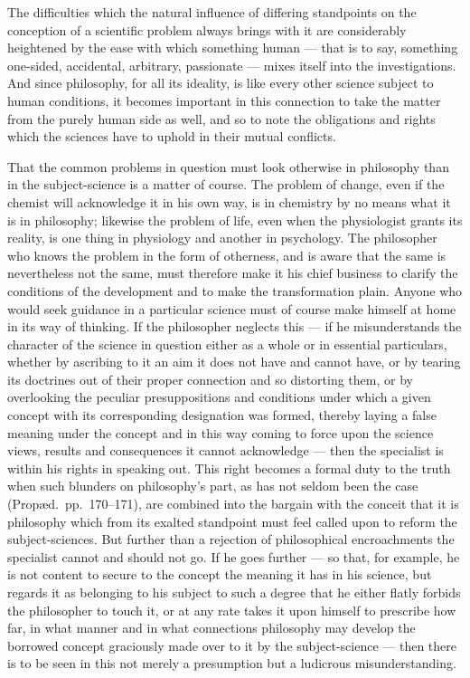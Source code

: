 \documentclass[12pt,a4paper]{book}
\begin{document}
The difficulties which the natural influence of differing standpoints on the
conception of a scientific problem always brings with it are considerably
heightened by the ease with which something human --- that is to say, something
one-sided, accidental, arbitrary, passionate --- mixes itself into the
investigations. And since philosophy, for all its ideality, is like every other
science subject to human conditions, it becomes important in this connection to
take the matter from the purely human side as well, and so to note the
obligations and rights which the sciences have to uphold in their mutual
conflicts.

That the common problems in question must look otherwise in philosophy than in
the subject-science is a matter of course. The problem of change, even if the
chemist will acknowledge it in his own way, is in chemistry
by no means what it is in philosophy; likewise the problem of life, even when
the physiologist grants its reality, is one thing in physiology and another in
psychology. The philosopher who knows the problem in the form of otherness, and
is aware that the same is nevertheless not the same, must therefore make it his
chief business to clarify the conditions of the development and to make the
transformation plain. Anyone who would seek guidance in a particular science
must of course make himself at home in its way of thinking. If the philosopher
neglects this --- if he misunderstands the character of the science in question
either as a whole or in essential particulars, whether by ascribing to it an
aim it does not have and cannot have, or by tearing its doctrines out of their
proper connection and so distorting them, or by overlooking the peculiar
presuppositions and conditions under which a given concept with its
corresponding designation was formed, thereby laying a false meaning under the
concept and in this way coming to force upon the science views, results and
consequences it cannot acknowledge --- then the specialist is within his rights
in speaking out. This right becomes a formal duty to the truth when such
blunders on philosophy's part, as has not seldom been the case (Propæd.\
pp.~170--171), are combined into the bargain with the conceit that it is
philosophy which from its exalted standpoint must feel called upon to reform
the subject-sciences. But further than a rejection of philosophical
encroachments the specialist cannot and should not go. If he goes further ---
so that, for example, he is not content to secure to the concept the meaning it
has in his science, but regards it as belonging to his subject to such a degree
that he either flatly forbids the philosopher to touch it, or at any rate takes
it upon himself to prescribe how far, in what manner and in what connections
philosophy may develop the borrowed concept graciously made over to it by
the subject-science --- then there is to be seen in this not merely a
presumption but a ludicrous misunderstanding.
\end{document}
